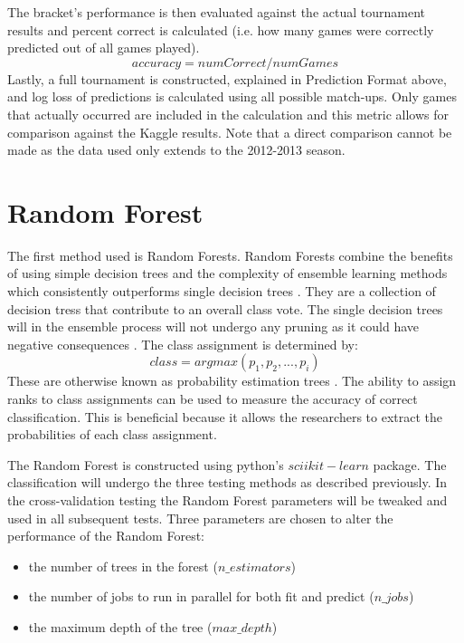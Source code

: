 \documentclass[conference]{IEEEtran}
\begin{document}
{The bracket's performance is then evaluated against the actual tournament results and percent correct is calculated (i.e. how many games were correctly predicted out of all games played).
\begin{equation}
accuracy = numCorrect/numGames
\label{pred-accuracy}
\end{equation}
Lastly, a full tournament is constructed, explained in Prediction Format above, and log loss of predictions is calculated using all possible match-ups. 
Only games that actually occurred are included in the calculation and this metric allows for comparison against the Kaggle results. 
Note that a direct comparison cannot be made as the data used only extends to the 2012-2013 season.

\section{Random Forest}
The first method used is Random Forests. 
Random Forests combine the benefits of using simple decision trees and the complexity of ensemble learning methods which consistently outperforms single decision trees \cite{THOMASG.DIETTERICH:1999}.
They are a collection of decision tress that contribute to an overall class vote.
The single decision trees will in the ensemble process will not undergo any pruning as it could have negative consequences \cite{THOMASG.DIETTERICH:1999}. 
The class assignment is determined by:
\begin{equation}
class = argmax(p_1, p_2,...,p_i)
\end{equation}
These are otherwise known as probability estimation trees \cite{THOMASG.DIETTERICH:1999}.
The ability to assign ranks to class assignments can be used to measure the accuracy of correct classification.
This is beneficial because it allows the researchers to extract the probabilities of each class assignment. 

The Random Forest is constructed using python's $sciikit-learn$ package. 
The classification will undergo the three testing methods as described previously. 
In the cross-validation testing the Random Forest parameters will be tweaked and used in all subsequent tests. 
Three parameters are chosen to alter the performance of the Random Forest:
\begin{itemize}
\item the number of trees in the forest ($n\_estimators$)
\item the number of jobs to run in parallel for both fit and predict ($n\_jobs$)
\item the maximum depth of the tree ($max\_depth$)
\end{itemize}

}
\end{document}

